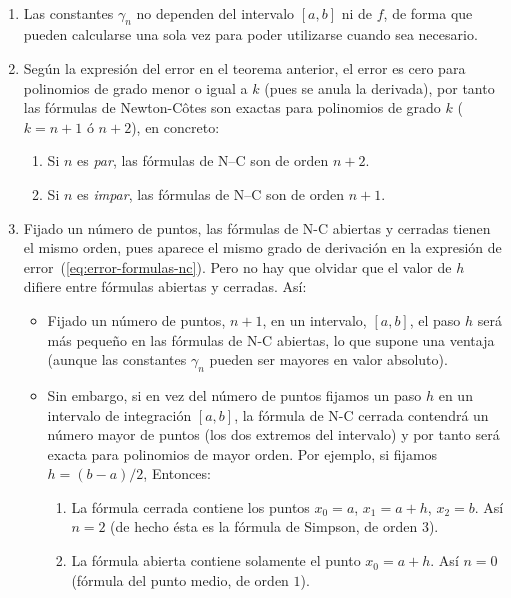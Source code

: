 \begin{remark}~
  \label{rk:7}
  \begin{enumerate}
  \item Las constantes $\gamma_n$ no dependen del intervalo $[a,b]$ ni
    de $f$, de forma que pueden calcularse una sola vez para poder
    utilizarse cuando sea necesario.
  \item Según la expresión del error en el teorema anterior, el error
    es cero para polinomios de grado menor o igual a $k$ (pues se
    anula la derivada), por tanto las fórmulas de Newton-Côtes son
    exactas para polinomios de grado $k$ ($k=n+1$ ó $n+2$), en
    concreto:
    \begin{enumerate}
    \item Si $n$ es \textit{par}, las fórmulas de N--C son de 
      orden $n+2$.
    \item Si $n$ es \textit{impar}, las fórmulas de N--C son de 
      orden $n+1$.
    \end{enumerate}
  \item Fijado un número de puntos, las fórmulas de N-C abiertas y
    cerradas tienen el mismo orden, pues aparece el mismo grado de
    derivación en la expresión de
    error~(\ref{eq:error-formulas-nc}). Pero no hay que olvidar que el
    valor de $h$ difiere entre fórmulas abiertas y cerradas. Así:
    \begin{itemize}
    \item Fijado un número de puntos, $n+1$, en un intervalo,
      $[a,b]$, el paso $h$ será más pequeño en las fórmulas de N-C
      abiertas, lo que supone una ventaja (aunque las constantes
      $\gamma_n$ pueden ser mayores en valor absoluto).
    \item Sin embargo, si en vez del número de puntos fijamos un paso
      $h$ en un intervalo de integración $[a,b]$, la fórmula de N-C
      cerrada contendrá un número mayor de puntos (los dos extremos
      del intervalo) y por tanto será exacta para polinomios de mayor
      orden. Por ejemplo, si fijamos $h=(b-a)/2$, Entonces:
      \begin{enumerate}
      \item La fórmula cerrada contiene los puntos $x_0=a$, $x_1=a+h$,
        $x_2=b$. Así $n=2$ (de hecho ésta es la fórmula de Simpson, de
        orden $3$).
      \item La fórmula abierta contiene solamente el punto $x_0=a+h$.
        Así $n=0$ (fórmula del punto medio, de orden $1$).
      \end{enumerate}
    \end{itemize}
 

\end{enumerate}
\end{remark}
